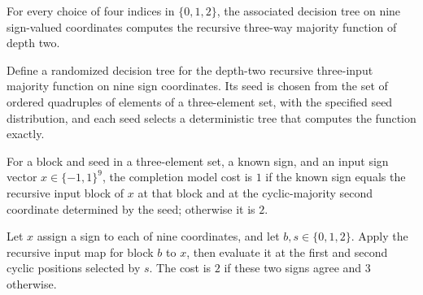 \begin{theorem}
\label{FABL.depthTwoInterleavedTreeBySeed_computes}
\leanok
{}
For every choice of four indices in $\{0,1,2\}$, the associated decision tree on nine
sign-valued coordinates computes the recursive three-way majority function of depth two.
\end{theorem}

\begin{definition}
\label{FABL.depthTwoInterleavedRandomizedTree}
\leanok
{}
Define a randomized decision tree for the depth-two recursive three-input majority
function on nine sign coordinates. Its seed is chosen from the set of ordered quadruples
of elements of a three-element set, with the specified seed distribution, and each seed
selects a deterministic tree that computes the function exactly.
\end{definition}

\begin{definition}
\label{FABL.depthTwoCompletionModelCost}
\leanok
{}
For a block and seed in a three-element set, a known sign, and an input sign vector
$x\in\{−1,1\}^9$, the completion model cost is $1$ if the known sign equals the
recursive input block of $x$ at that block and at the cyclic-majority second coordinate
determined by the seed; otherwise it is $2$.
\end{definition}

\begin{definition}
\label{FABL.depthTwoEvaluationModelCost}
\leanok
{}
Let $x$ assign a sign to each of nine coordinates, and let $b,s\in\{0,1,2\}$. Apply the
recursive input map for block $b$ to $x$, then evaluate it at the first and second
cyclic positions selected by $s$. The cost is $2$ if these two signs agree and $3$
otherwise.
\end{definition}

